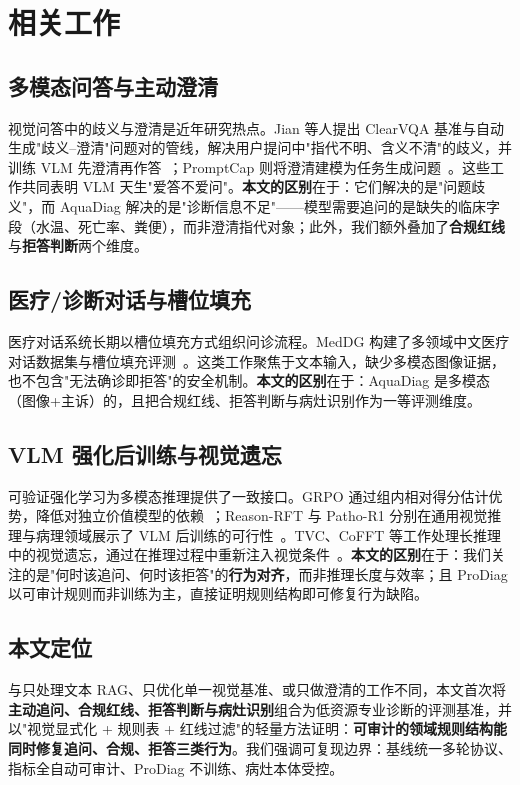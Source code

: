﻿\section{相关工作}
\label{sec:related}

\subsection{多模态问答与主动澄清}

视觉问答中的歧义与澄清是近年研究热点。Jian 等人提出 ClearVQA 基准与自动生成"歧义--澄清"问题对的管线，解决用户提问中"指代不明、含义不清"的歧义，并训练 VLM 先澄清再作答~\cite{jian2025teaching}；PromptCap 则将澄清建模为任务生成问题~\cite{hu2023promptcap}。这些工作共同表明 VLM 天生"爱答不爱问"。\textbf{本文的区别}在于：它们解决的是"问题歧义"，而 AquaDiag 解决的是"诊断信息不足"——模型需要追问的是缺失的临床字段（水温、死亡率、粪便），而非澄清指代对象；此外，我们额外叠加了\textbf{合规红线}与\textbf{拒答判断}两个维度。

\subsection{医疗/诊断对话与槽位填充}

医疗对话系统长期以槽位填充方式组织问诊流程。MedDG 构建了多领域中文医疗对话数据集与槽位填充评测~\cite{liu2020meddg}。这类工作聚焦于文本输入，缺少多模态图像证据，也不包含"无法确诊即拒答"的安全机制。\textbf{本文的区别}在于：AquaDiag 是多模态（图像+主诉）的，且把合规红线、拒答判断与病灶识别作为一等评测维度。

\subsection{VLM 强化后训练与视觉遗忘}

可验证强化学习为多模态推理提供了一致接口。GRPO 通过组内相对得分估计优势，降低对独立价值模型的依赖~\cite{shao2024deepseekmath}；Reason-RFT 与 Patho-R1 分别在通用视觉推理与病理领域展示了 VLM 后训练的可行性~\cite{tan2025reasonrft,zhang2026pathor1}。TVC、CoFFT 等工作处理长推理中的视觉遗忘，通过在推理过程中重新注入视觉条件~\cite{sun2025tvc,zhang2025cofft}。\textbf{本文的区别}在于：我们关注的是"何时该追问、何时该拒答"的\textbf{行为对齐}，而非推理长度与效率；且 ProDiag 以可审计规则而非训练为主，直接证明规则结构即可修复行为缺陷。

\subsection{本文定位}

与只处理文本 RAG、只优化单一视觉基准、或只做澄清的工作不同，本文首次将\textbf{主动追问、合规红线、拒答判断与病灶识别}组合为低资源专业诊断的评测基准，并以"视觉显式化 + 规则表 + 红线过滤"的轻量方法证明：\textbf{可审计的领域规则结构能同时修复追问、合规、拒答三类行为}。我们强调可复现边界：基线统一多轮协议、指标全自动可审计、ProDiag 不训练、病灶本体受控。
